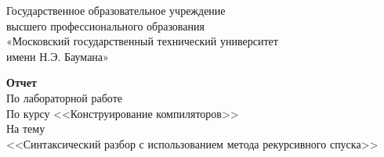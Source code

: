 \begin{titlepage}
	
	
	\thispagestyle{empty}
	
	\begin{figure}[t]
	\end{figure}
	\begin{center}
	Государственное образовательное учреждение\\
	высшего профессионального образования\\
 	«Московский государственный технический университет\\
 	имени Н.Э. Баумана»
	\end{center}
	
	\vspace{5cm}
	
	\begin{center}
		\textbf {Отчет}\\
		По лабораторной работе \\
		По курсу <<Конструирование компиляторов>>\\
		На тему\\
		<<Синтаксический разбор с использованием метода рекурсивного спуска>>\\
	\end{center}

	\vspace{8cm}
	

\end{titlepage}